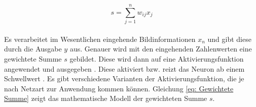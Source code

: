 		\begin{equation}
			s=\sum_{j=1}^n w_{ij}x_j
			\label{eq: Gewichtete Summe}
		\end{equation}
		\\
		
		 Es verarbeitet im Wesentlichen eingehende Bildinformationen $x_n$ und gibt diese durch die Ausgabe $y$ aus. Genauer wird mit den eingehenden Zahlenwerten eine gewichtete Summe $s$ gebildet. Diese wird dann auf eine Aktivierungsfunktion angewendet und ausgegeben \cite{bildv2020}. Diese aktiviert bzw. reizt das Neuron ab einem Schwellwert \cite{Kriesel}. Es gibt verschiedene Varianten der Aktivierungsfunktion, die je nach Netzart zur Anwendung kommen können. Gleichung \ref{eq: Gewichtete Summe} zeigt das mathematische Modell der gewichteten Summe $s$.\\
		
		
				
